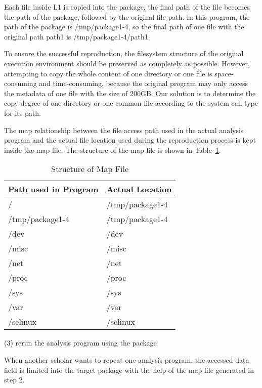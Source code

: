 \documentclass{acm_proc_article-sp}
\begin{document}
Each file inside L1 is copied into the package, the final path of the file becomes the path of the package, followed by the original file path. In this program, the path of the package is /tmp/package1-4, so the final path of one file with the original path path1 is /tmp/package1-4/path1.

To ensure the successful reproduction, the filesystem structure of the original
execution environment should be preserved as completely as possible. However,
attempting to copy the whole content of one directory or one file is
space-consuming and time-consuming, because the original program may only
access the metadata of one file with the size of 200GB. Our solution is to
determine the copy degree of one directory or one common file according to the
system call type for its path.

The map relationship between the file access path used in the actual analysis
program and the actual file location used during the reproduction process is
kept inside the map file. The structure of the map file is shown in Table~\ref{table:map-file}.

\begin{table}
    \centering
    \begin{tabular}{|l|l|}
    \hline
    Path used in Program & Actual Location \\ \hline
    / & /tmp/package1-4 \\ \hline
    /tmp/package1-4 & /tmp/package1-4 \\ \hline
    /dev & /dev \\ \hline
    /misc & /misc\\ \hline
    /net & /net\\ \hline
    /proc & /proc\\ \hline
    /sys & /sys\\ \hline
    /var & /var\\ \hline
    /selinux & /selinux\\ \hline
    \end{tabular}
    \caption{Structure of Map File}
    \label{table:map-file}
\end{table}

(3) rerun the analysis program using the package

When another scholar wants to repeat one analysis program, the accessed data
field is limited into the target package with the help of the map file 
generated in step 2. 
\end{document}
